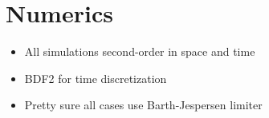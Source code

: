 \section{Numerics}\label{sec:numerics}

\begin{itemize}
	\item All simulations second-order in space and time
	\item BDF2 for time discretization
	\item Pretty sure all cases use Barth-Jespersen limiter
\end{itemize}